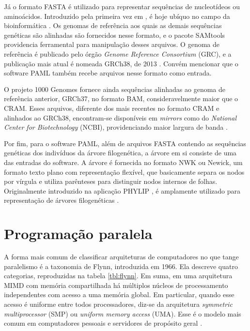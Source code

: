 \documentclass[cic,tc]{iiufrgs}
\begin{document}
Já o formato FASTA é utilizado para representar sequências
de nucleotídeos ou aminoácidos. Introduzido pela primeira vez em
\cite{fasta}, é hoje ubíquo no campo da
bioinformática \cite{shen2016seqkit}. Os genomas de referência aos quais as
demais sequências genéticas são alinhadas são fornecidos nesse formato, e o
pacote SAMtools providencia ferramental para manipulação desses arquivos. O
genoma de referência é publicado pelo órgão \textit{Genome Reference
Consortium} (GRC), e a publicação mais atual é nomeada GRCh38, de
2013 \cite{GUO201783}. Convém mencionar que o software PAML também recebe
arquivos nesse formato como entrada.

O projeto 1000 Genomes fornece ainda sequências alinhadas ao genoma de
referência anterior, GRCh37, no formato BAM, consideravelmente maior que o
CRAM. Esses arquivos, diferente dos mais recentes no formato CRAM e alinhados
ao GRCh38, encontram-se disponíveis em \textit{mirrors} como do
\textit{National Center for Biotechnology} (NCBI), providenciando maior largura
de banda \cite{clarke20121000}.

Por fim, para o software PAML, além de arquivos FASTA contendo as sequências
genéticas dos indivíduos da árvore filogenética, a árvore em si consiste de uma
das entradas do software. A árvore é fornecida no formato NWK ou Newick, um
formato texto plano com representação flexível, que basicamente separa os nodos
por vírgula e utiliza parênteses para distinguir nodos internos de folhas.
Originalmente introduzido na aplicação PHYLIP \cite{felsenstein1993phylip}, é
amplamente utilizado para representação de árvores filogenéticas \cite{fredslund2006phy}.

\section{Programação paralela}
\label{sec:par}

A forma mais comum de classificar arquiteturas de computadores no que tange
paralelismo é a taxonomia de Flynn, introduzida em 1966. Ela descreve quatro
categorias, reproduzidas na tabela \ref{tbl:flynn}. Em suma, em uma arquitetura
MIMD com memória compartilhada há múltiplos núcleos de processamento
independentes com acesso a uma memória global. Em particular, quando esse
acesso é uniforme entre todos processadores, diz-se da arquitetura
\textit{symmetric multiprocessor} (SMP) ou \textit{uniform memory access}
(UMA). Esse é o modelo mais comum em computadores pessoais e servidores de
propósito geral \cite{el2005advanced}.
\end{document}

